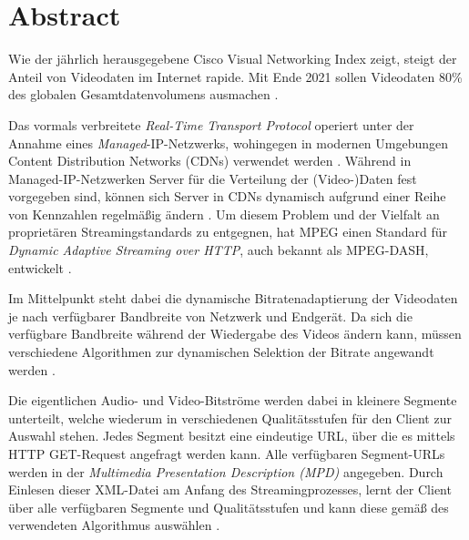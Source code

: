 \documentclass[paper = a4, fontsize = 12pt, parskip = half]{scrartcl} %
\begin{document}


\tableofcontents
\pagebreak



\setcounter{page}{1}
\onehalfspacing

\section*{Abstract}
Wie der jährlich herausgegebene Cisco Visual Networking Index \cite{cisco_syst_inc_cisco_2017} zeigt, steigt der Anteil von Videodaten im Internet rapide. Mit Ende 2021 sollen Videodaten 80\% des globalen Gesamtdatenvolumens ausmachen \cite{cisco_syst_inc_cisco_2017}.

Das vormals verbreitete \textit{Real-Time Transport Protocol} operiert unter der Annahme eines \textit{Managed}-IP-Netzwerks, wohingegen in modernen Umgebungen Content Distribution Networks (CDNs) verwendet werden \cite{sodagar_mpeg-dash_2011}. Während in Managed-IP-Netzwerken Server für die Verteilung der (Video-)Daten fest vorgegeben sind, können sich Server in CDNs dynamisch aufgrund einer Reihe von Kennzahlen regelmäßig ändern \cite{buyya_content_2008}. Um diesem Problem und der Vielfalt an proprietären Streamingstandards zu entgegnen, hat MPEG einen Standard für \textit{Dynamic Adaptive Streaming over HTTP}, auch bekannt als MPEG-DASH, entwickelt \cite{sodagar_mpeg-dash_2011}.

Im Mittelpunkt steht dabei die dynamische Bitratenadaptierung der Videodaten je nach verfügbarer Bandbreite von Netzwerk und Endgerät. Da sich die verfügbare Bandbreite während der Wiedergabe des Videos ändern kann, müssen verschiedene Algorithmen zur dynamischen Selektion der Bitrate angewandt werden \cite{bentaleb_survey_2019}.

Die eigentlichen Audio- und Video-Bitströme werden dabei in kleinere Segmente unterteilt, welche wiederum in verschiedenen Qualitätsstufen für den Client zur Auswahl stehen. Jedes Segment besitzt eine eindeutige URL, über die es mittels HTTP GET-Request angefragt werden kann. Alle verfügbaren Segment-URLs werden in der \textit{Multimedia Presentation Description (MPD)} angegeben. Durch Einlesen dieser XML-Datei am Anfang des Streamingprozesses, lernt der Client über alle verfügbaren Segmente und Qualitätsstufen und kann diese gemäß des verwendeten Algorithmus auswählen \cite{sodagar_mpeg-dash_2011}.
\end{document}
